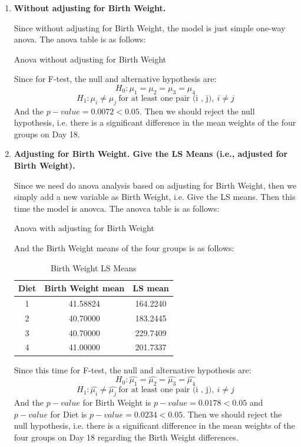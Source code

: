 \documentclass[10pt,letterpaper]{article}
\begin{document}
\begin{enumerate}[leftmargin=0cm,itemindent=.5cm,labelwidth=\itemindent,labelsep=0cm,align=left]
\item[\textbullet] \textbf{Without adjusting for Birth Weight.}

Since without adjusting for Birth Weight, the model is just simple one-way anova. The anova table is as follows:
\begin{center}
Anova without adjusting for Birth Weight

\end{center} 
Since for F-test, the null and alternative hypothesis are:
\[H_0: \mu_1=\mu_2=\mu_3=\mu_4\]
\[H_1: \mu_i \neq \mu_j  \ \text{for at least one pair (i , j)},\  i \neq j\]
And the $p-value = 0.0072<0.05$. Then we should reject the null hypothesis, i.e. there is a significant difference in the mean weights of the four groups on Day 18. 

\item[\textbullet] \textbf{Adjusting for Birth Weight. Give the LS Means (i.e., adjusted for Birth Weight).}

Since we need do anova analysis based on adjusting for Birth Weight, then we simply add a new variable as Birth Weight, i.e. Give the LS means. Then this time the model is anovca. The anovca table is as follows:
\begin{center}
Anova with adjusting for Birth Weight

\end{center} 

And the Birth Weight means of the four groups is as follows:
\begin{table}[h]
\caption{Birth Weight LS Means}
\centering
\begin{tabular*}{0.5\linewidth}{@{\extracolsep{\fill}}ccc}
\hline 
Diet & Birth Weight mean & LS mean\\
\hline
1 & 41.58824 & 164.2240\\
\hline
2 & 40.70000 & 183.2445\\
\hline
3 & 40.70000 & 229.7409\\
\hline
4 & 41.00000 & 201.7337\\
\hline
\end{tabular*}
\end{table}
Since this time for F-test, the null and alternative hypothesis are:
\[H_0: \hat{\mu_1}=\hat{\mu_2}=\hat{\mu_3}=\hat{\mu_4}\]
\[H_1: \hat{\mu_i} \neq \hat{\mu_j}  \ \text{for at least one pair (i , j)},\  i \neq j\]
And the $p-value$ for Birth Weight is $p-value = 0.0178<0.05$ and $p-value$ for Diet is $p-value = 0.0234<0.05$. Then we should reject the null hypothesis, i.e. there is a significant difference in the mean weights of the four groups on Day 18 regarding the Birth Weight differences.


\end{enumerate}
\end{document}
